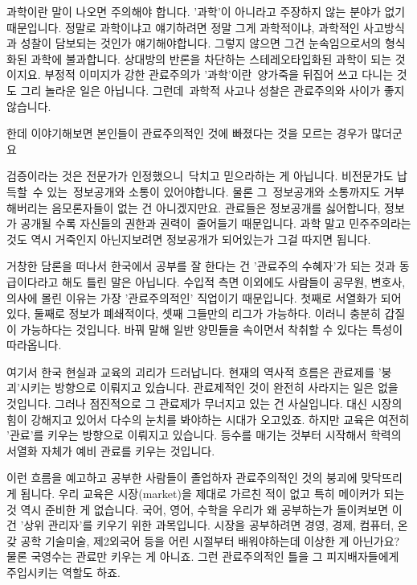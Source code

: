 과학이란 말이 나오면 주의해야 합니다. '과학'이 아니라고 주장하지 않는 분야가 없기 때문입니다.
정말로 과학이냐고 얘기하려면 정말 그게 과학적이냐, 과학적인 사고방식과 성찰이 담보되는 것인가 얘기해야합니다.
그렇지 않으면 그건 눈속임으로서의 형식화된 과학에 불과합니다.
상대방의 반론을 차단하는 스테레오타입화된 과학이 되는 것이지요.
부정적 이미지가 강한 관료주의가 '과학'이란 양가죽을 뒤집어 쓰고 다니는 것도 그리 놀라운 일은 아닙니다.
그런데 과학적 사고나 성찰은 관료주의와 사이가 좋지 않습니다.
\vspace{5mm}

한데 이야기해보면 본인들이 관료주의적인 것에 빠졌다는 것을 모르는 경우가 많더군요
\vspace{5mm}

검증이라는 것은 전문가가 인정했으니 닥치고 믿으라하는 게 아닙니다. 비전문가도 납득할 수 있는 정보공개와 소통이 있어야합니다.
물론 그 정보공개와 소통까지도 거부해버리는 음모론자들이 없는 건 아니겠지만요.
관료들은 정보공개를 싫어합니다, 정보가 공개될 수록 자신들의 권한과 권력이 줄어들기 때문입니다.
과학 말고 민주주의라는 것도 역시 거죽인지 아닌지보려면 정보공개가 되어있는가 그걸 따지면 됩니다.
\vspace{5mm}

거창한 담론을 떠나서 한국에서 공부를 잘 한다는 건 '관료주의 수혜자'가 되는 것과 동급이다라고 해도 틀린 말은 아닙니다.
수입적 측면 이외에도 사람들이 공무원, 변호사, 의사에 몰린 이유는 가장 '관료주의적인' 직업이기 때문입니다.
첫째로 서열화가 되어있다, 둘째로 정보가 폐쇄적이다, 셋째 그들만의 리그가 가능하다.
이러니 충분히 갑질이 가능하다는 것입니다. 바꿔 말해 일반 양민들을 속이면서 착취할 수 있다는 특성이 따라옵니다.
\vspace{5mm}

여기서 한국 현실과 교육의 괴리가 드러납니다.
현재의 역사적 흐름은 관료제를 '붕괴'시키는 방향으로 이뤄지고 있습니다. 관료제적인 것이 완전히 사라지는 일은 없을 것입니다.
그러나 점진적으로 그 관료제가 무너지고 있는 건 사실입니다. 대신 시장의 힘이 강해지고 있어서 다수의 눈치를 봐야하는 시대가 오고있죠.
하지만 교육은 여전히 '관료'를 키우는 방향으로 이뤄지고 있습니다.
등수를 매기는 것부터 시작해서 학력의 서열화 자체가 예비 관료를 키우는 것입니다.
\vspace{5mm}

이런 흐름을 예고하고 공부한 사람들이 졸업하자 관료주의적인 것의 붕괴에 맞닥뜨리게 됩니다.
우리 교육은 시장(market)을 제대로 가르친 적이 없고 특히 메이커가 되는 것 역시 준비한 게 없습니다.
국어, 영어, 수학을 우리가 왜 공부하는가 돌이켜보면 이건 '상위 관리자'를 키우기 위한 과목입니다.
시장을 공부하려면 경영, 경제, 컴퓨터, 온갖 공학 기술미술, 제2외국어 등을 어린 시절부터 배워야하는데 이상한 게 아닌가요?
물론 국영수는 관료만 키우는 게 아니죠. 그런 관료주의적인 틀을 그 피지배자들에게 주입시키는 역할도 하죠.
\vspace{5mm}

